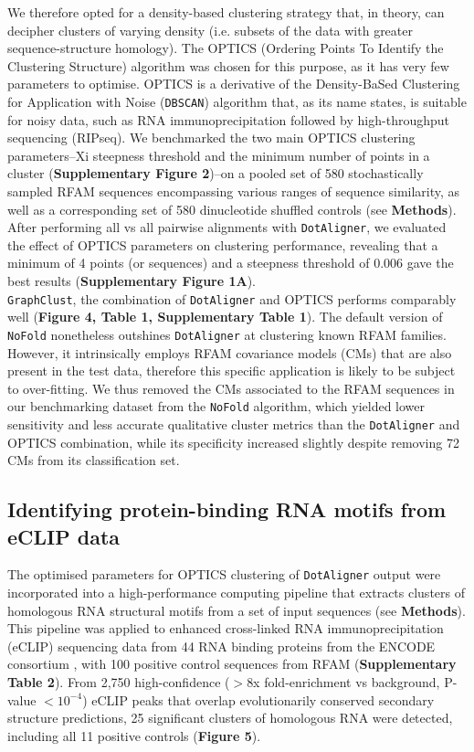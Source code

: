 \documentclass{bmcart}
\newcommand\dotaligner{\texttt{DotAligner}}
\begin{document}
We therefore opted for a density-based clustering strategy that, in theory, can decipher 
clusters of varying density (i.e. subsets of the data with greater sequence-structure homology). 
The OPTICS (Ordering Points To Identify the Clustering Structure) algorithm \cite{ankerst99ordering}
was chosen for this purpose, as it has very few parameters to optimise. 
OPTICS is a derivative of the Density-BaSed Clustering for Application with Noise
 (\texttt{DBSCAN}) \cite{ester1996density} algorithm that, as its name states, is suitable 
 for noisy data, such as RNA immunoprecipitation followed by high-throughput sequencing 
 (RIPseq). We  benchmarked the two main OPTICS clustering parameters--Xi steepness threshold 
and the minimum number of points in a cluster (\textbf{Supplementary Figure 2})--on 
a pooled set of 580 stochastically sampled RFAM sequences encompassing various ranges of sequence similarity, 
as well as a corresponding set of 580 dinucleotide shuffled controls (see \textbf{Methods}). 
After performing all vs all pairwise alignments with \dotaligner{}, 
we evaluated the effect of OPTICS parameters on clustering performance, 
revealing that a minimum of 4 points (or sequences) and a steepness threshold of 0.006 
gave the best results (\textbf{Supplementary Figure 1A}). \\

\texttt{GraphClust}, 
the combination of \dotaligner{} and OPTICS performs comparably well (\textbf{Figure 4, Table 1, Supplementary Table 1}). 
The default version of \texttt{NoFold} nonetheless outshines \dotaligner{} at clustering known RFAM families. 
However, it intrinsically employs RFAM covariance models (CMs) that are also present in the test data, 
therefore this specific application is likely to be subject to over-fitting. 
We thus removed the CMs associated to the RFAM sequences in our benchmarking 
dataset from the \texttt{NoFold} algorithm, which yielded lower sensitivity and 
less accurate qualitative cluster metrics than the \dotaligner{} and OPTICS combination, while 
its specificity increased slightly despite removing 72 CMs from its classification set.


\subsection*{Identifying protein-binding RNA motifs from eCLIP data}
The optimised parameters for OPTICS clustering of \dotaligner{} output were incorporated into 
a high-performance computing pipeline that extracts clusters of homologous RNA structural
 motifs from a set of input sequences (see \textbf{Methods}).  This pipeline was applied to enhanced cross-linked 
RNA immunoprecipitation (eCLIP) sequencing data from 44 RNA binding proteins from the ENCODE consortium  \cite{van2016robust}, with 100 positive control sequences from RFAM (\textbf{Supplementary Table 2}).
From 2,750 high-confidence ($>$8x fold-enrichment vs background, P-value $<10^{-4}$) eCLIP peaks 
that overlap evolutionarily conserved secondary structure predictions, 
25 significant clusters of homologous RNA were detected, including all 11 positive controls (\textbf{Figure 5}).\\
\end{document}
